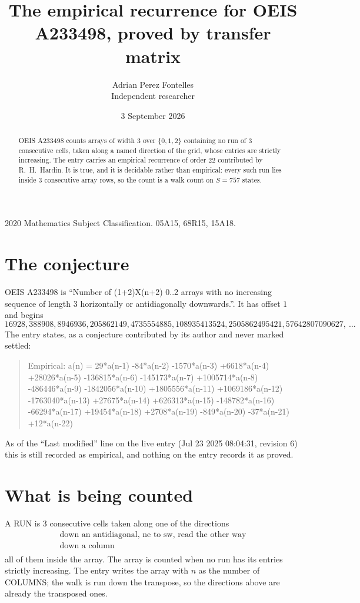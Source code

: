 \documentclass[11pt,a4paper]{article}
\title{The empirical recurrence for OEIS A233498, proved by transfer matrix}
\author{Adrian Perez Fontelles\\ \small Independent researcher}
\date{3 September 2026}
\theoremstyle{plain}
\theoremstyle{definition}
\begin{document}
\maketitle

\begin{abstract}
OEIS A233498 counts arrays of width $3$ over $\{0,1,2\}$ containing no run of $3$ consecutive
cells, taken along a named direction of the grid, whose entries are strictly increasing. The entry carries
an empirical recurrence of order $22$ contributed by R.~H.~Hardin. It is true, and it is
decidable rather than empirical: every such run lies inside $3$ consecutive array rows, so
the count is a walk count on $S=757$ states.
\end{abstract}

\noindent\small 2020 Mathematics Subject Classification. 05A15, 68R15, 15A18.\normalsize

\section{The conjecture}

OEIS A233498 is ``Number of (1+2)X(n+2) 0..2 arrays with no increasing sequence of length 3 horizontally or antidiagonally downwards.''. It has offset $1$ and begins
\[
16928, 388908, 8946936, 205862149, 4735554885, 108935413524, 2505862495421, 57642807090627,\ \dots
\]
The entry states, as a conjecture contributed by its author and never marked settled:
\begin{quote}
Empirical: a(n) = 29*a(n-1) -84*a(n-2) -1570*a(n-3) +6618*a(n-4) +28026*a(n-5) -136815*a(n-6) -145173*a(n-7) +1005714*a(n-8) -486446*a(n-9) -1842056*a(n-10) +1805556*a(n-11) +1069186*a(n-12) -1763040*a(n-13) +27675*a(n-14) +626313*a(n-15) -148782*a(n-16) -66294*a(n-17) +19454*a(n-18) +2708*a(n-19) -849*a(n-20) -37*a(n-21) +12*a(n-22)
\end{quote}
As of the ``Last modified'' line on the live entry (Jul 23 2025 08:04:31, revision 6) this is still
recorded as empirical, and nothing on the entry records it as proved.

\section{What is being counted}

A RUN is $3$ consecutive cells taken along one of the directions
\[
\begin{array}{l}
\text{down an antidiagonal, ne to sw, read the other way} \\
\text{down a column} \\
\end{array}
\]
all of them inside the array. The array is counted when no run has its entries strictly increasing. The entry writes the array with $n$ as the number of COLUMNS; the walk is run down the transpose, so the directions above are already the transposed ones.
\end{document}
